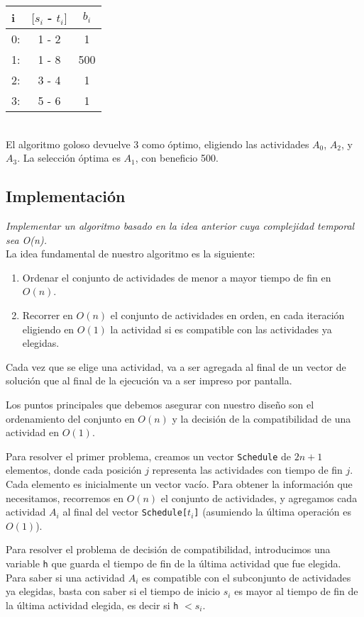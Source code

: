 \documentclass[10pt, a4paper]{article}
\begin{document}
\begin{tabular}{l c c}
i & $[s_i$ - $t_i]$ & $b_i$ \\
\hline
0: & 1 - 2 & 1 \\
1: & 1 - 8 & 500 \\
2: & 3 - 4 & 1 \\
3: & 5 - 6 & 1
\end{tabular} \\

El algoritmo goloso devuelve 3 como óptimo, eligiendo las actividades $A_0$, $A_2$, y $A_3$. La selección óptima es $A_1$, con beneficio 500.

\subsection{Implementación}
\emph{Implementar un algoritmo basado en la idea anterior cuya complejidad temporal sea O(n).} \\

La idea fundamental de nuestro algoritmo es la siguiente:
\begin{enumerate}
    \item Ordenar el conjunto de actividades de menor a mayor tiempo de fin en $O(n)$.
    \item Recorrer en $O(n)$ el conjunto de actividades en orden, en cada iteración eligiendo en $O(1)$ la actividad si es compatible con las actividades ya elegidas.
\end{enumerate}

Cada vez que se elige una actividad, va a ser agregada al final de un vector de solución que al final de la ejecución va a ser impreso por pantalla.

Los puntos principales que debemos asegurar con nuestro diseño son el ordenamiento del conjunto en $O(n)$ y la decisión de la compatibilidad de una actividad en $O(1)$.

Para resolver el primer problema, creamos un vector \texttt{Schedule} de $2n+1$ elementos, donde cada posición $j$ representa las actividades con tiempo de fin $j$. Cada elemento es inicialmente un vector vacío. Para obtener la información que necesitamos, recorremos en $O(n)$ el conjunto de actividades, y agregamos cada actividad $A_i$ al final del vector \texttt{Schedule[$t_i$]} (asumiendo la última operación es $O(1)$).

Para resolver el problema de decisión de compatibilidad, introducimos una variable \texttt{h} que guarda el tiempo de fin de la última actividad que fue elegida. Para saber si una actividad $A_i$ es compatible con el subconjunto de actividades ya elegidas, basta con saber si el tiempo de inicio $s_i$ es mayor al tiempo de fin de la última actividad elegida, es decir si \texttt{h} $< s_i$.
\end{document}
